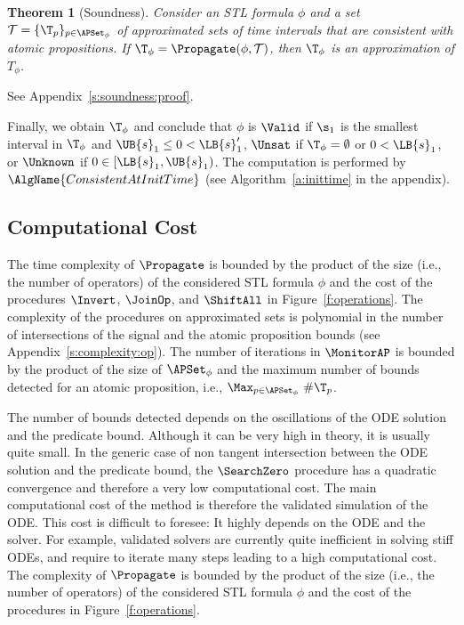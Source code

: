 \documentclass[paper]{ieice}
\newtheorem{theorem}{Theorem}
\newenvironment{proof}[1][Proof.]{\begin{trivlist}
\item[\hskip \labelsep {\itshape #1}]}{\end{trivlist}}
\begin{document}
\begin{theorem}[Soundness] \label{th:soundness}
	Consider an STL formula $\phi$ and a set $\mathcal{T} = \{\T_p\}_{p \in \APSet_\phi}$ of approximated sets of time intervals that are consistent with atomic propositions.
	If $\T_\phi = \Propagate(\phi, \mathcal{T})$,
	then $\T_\phi$ is an approximation of $T_\phi$.
\end{theorem}
\begin{proof}
	See Appendix~\ref{s:soundness:proof}.
\end{proof}

Finally, we obtain $\T_\phi$ and conclude that $\phi$ is $\Valid$ if $\s_1$ is the smallest interval in $\T_\phi$ and $\UB{s}_1 \leq 0 < \LB{s}_1'$, $\Unsat$ if $\T_\phi = \emptyset$ or $0 < \LB{s}_1$, or $\Unknown$ if $0 \in [\LB{s}_1,\UB{s}_1)$.
The computation is performed by $\AlgName{ConsistentAtInitTime}$ (see Algorithm~\ref{a:inittime} in the appendix).


\subsection{Computational Cost}
\label{s:complexity}

The time complexity of $\Propagate$ is bounded by the product of the size (i.e., the number of operators) of the considered STL formula $\phi$ and the cost of the procedures $\Invert$, $\JoinOp$, and $\ShiftAll$ in Figure~\ref{f:operations}.
The complexity of the procedures on approximated sets is polynomial in the number of intersections of the signal and the atomic proposition bounds (see Appendix~\ref{s:complexity:op}). The number of iterations in $\MonitorAP$ is bounded by the product of the size of $\APSet_\phi$ and the maximum number of bounds detected for an atomic proposition, i.e., $\Max_{p\in\APSet_\phi}\ \#\T_p$.

The number of bounds detected depends on the oscillations of the ODE solution and the predicate bound. Although it can be very high in theory, it is usually quite small. In the generic case of non tangent intersection between the ODE solution and the predicate bound, the $\SearchZero$ procedure has a quadratic convergence and therefore a very low computational cost. The main computational cost of the method is therefore the validated simulation of the ODE. This cost is difficult to foresee: It highly depends on the ODE and the solver. For example, validated solvers are currently quite inefficient in solving stiff ODEs, and require to iterate many steps leading to a high computational cost. The complexity of $\Propagate$ is bounded by the product of the size (i.e., the number of operators) of the considered STL formula $\phi$ and the cost of the procedures in Figure~\ref{f:operations}.
\end{document}
